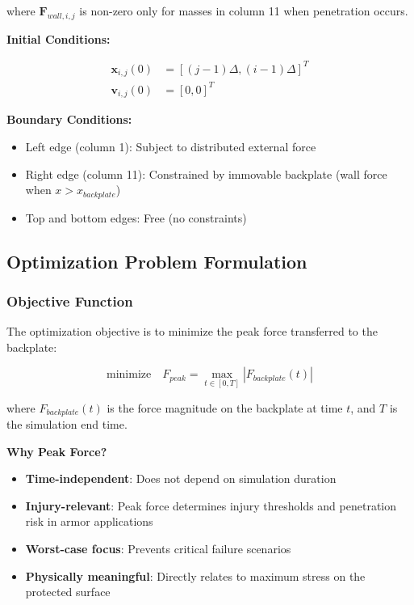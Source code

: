 \documentclass[11pt,a4paper]{article}
\begin{document}
\noindent where $\mathbf{F}_{wall,i,j}$ is non-zero only for masses in column 11 when penetration occurs. \newline

\noindent \textbf{Initial Conditions:}

\begin{align}
\mathbf{x}_{i,j}(0) &= [(j-1)\Delta, (i-1)\Delta]^T \\
\mathbf{v}_{i,j}(0) &= [0, 0]^T
\end{align}

\noindent \textbf{Boundary Conditions:}

\begin{itemize}
    \item Left edge (column 1): Subject to distributed external force
    \item Right edge (column 11): Constrained by immovable backplate (wall force when $x > x_{backplate}$)
    \item Top and bottom edges: Free (no constraints)
\end{itemize}

\subsection{Optimization Problem Formulation}

\subsubsection{Objective Function}

\noindent The optimization objective is to minimize the peak force transferred to the backplate:

\begin{equation}
\text{minimize} \quad F_{peak} = \max_{t \in [0,T]} |F_{backplate}(t)|
\end{equation}

\noindent where $F_{backplate}(t)$ is the force magnitude on the backplate at time $t$, and $T$ is the simulation end time. \newline

\noindent \textbf{Why Peak Force?}
\begin{itemize}
    \item \textbf{Time-independent}: Does not depend on simulation duration
    \item \textbf{Injury-relevant}: Peak force determines injury thresholds and penetration risk in armor applications
    \item \textbf{Worst-case focus}: Prevents critical failure scenarios
    \item \textbf{Physically meaningful}: Directly relates to maximum stress on the protected surface
\end{itemize}
\end{document}
